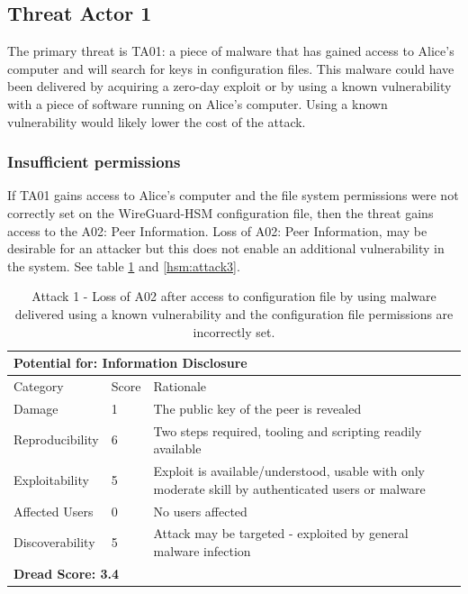 \documentclass [11pt, proquest] {uwthesis}[2020/02/24]
\begin{document}
\subsection{Threat Actor 1}
The primary threat is TA01: a piece of malware that has gained access to Alice's computer and will search for keys in configuration files. This malware could have been delivered by acquiring a zero-day exploit or by using a known vulnerability with a piece of software running on Alice's computer. Using a known vulnerability would likely lower the cost of the attack.

\subsubsection{Insufficient permissions}
If TA01 gains access to Alice's computer and the file system permissions were not correctly set on the WireGuard-HSM configuration file, then the threat gains access to the A02: Peer Information. Loss of A02: Peer Information, may be desirable for an attacker but this does not enable an additional vulnerability in the system.
See table \ref{hsm:attack1} and \ref{hsm:attack3}.

\begin{table}[H]
\begin{tabular}{|m{3cm}|m{.9cm}|p{27em} |}
\multicolumn{3}{l}{Potential for: Information Disclosure}    \\
\hline
Category & Score & Rationale     \\
\hline
Damage          & 1     & The public key of the peer is revealed  \\
\hline
Reproducibility & 6     & Two steps required, tooling and scripting readily available  \\
\hline
Exploitability & 5      & Exploit is available/understood, usable with only moderate skill by authenticated users or malware \\
\hline
Affected Users  & 0     & No users affected  \\
\hline
Discoverability & 5     & Attack may be targeted - exploited by general malware infection \\
\hline
\multicolumn{3}{l}{\textbf{Dread Score: 3.4}} 
\end{tabular}
\caption{Attack 1 - Loss of A02 after access to configuration file by using malware delivered using a known vulnerability and the configuration file permissions are incorrectly set.}
\label{hsm:attack1}
\end{table}
\end{document}
